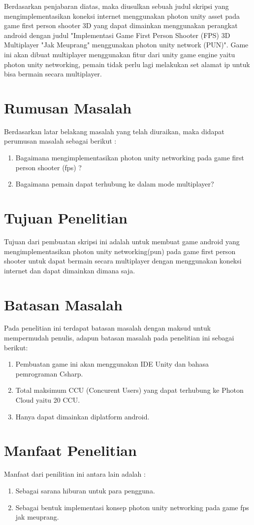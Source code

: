 Berdasarkan penjabaran diatas, maka diusulkan sebuah judul skripsi yang mengimplementasikan koneksi internet menggunakan photon unity asset pada game first person shooter 3D yang dapat dimainkan menggunakan perangkat android dengan judul "Implementasi Game First Person Shooter (FPS) 3D Multiplayer "Jak Meuprang" menggunakan photon unity network (PUN)".
Game ini akan dibuat multiplayer menggunakan fitur dari unity game engine yaitu photon unity networking, pemain tidak perlu lagi melakukan set alamat ip untuk bisa bermain secara multiplayer.

\section{Rumusan Masalah}
Berdasarkan latar belakang masalah yang telah diuraikan, maka didapat perumusan masalah sebagai berikut :
\begin{enumerate}
	\item Bagaimana mengimplementasikan photon unity networking pada game first person shooter (fps) ?
	\item Bagaimana pemain dapat terhubung ke dalam mode multiplayer?
	\end{enumerate}	
\section{Tujuan Penelitian}
Tujuan dari pembuatan skripsi ini adalah untuk membuat game android yang mengimplementasikan photon unity networking(pun) pada game first person shooter untuk dapat bermain secara multiplayer dengan menggunakan koneksi internet dan dapat dimainkan dimana saja.

\section{Batasan Masalah}
Pada penelitian ini terdapat batasan masalah dengan maksud untuk mempermudah penulis, adapun batasan masalah pada penelitian ini sebagai berikut:
\begin{enumerate}
	\item Pembuatan game ini akan menggunakan IDE Unity dan bahasa pemrograman Csharp.
	\item Total maksimum CCU (Concurent Users) yang dapat terhubung ke Photon Cloud yaitu 20 CCU.
	\item Hanya dapat dimainkan diplatform android.
\end{enumerate}

\section{Manfaat Penelitian}
Manfaat dari penilitian ini antara lain adalah : 
\begin{enumerate}
	\item Sebagai sarana hiburan untuk para pengguna.
	\item Sebagai bentuk implementasi konsep photon unity networking pada game fps jak meuprang.
\end{enumerate}